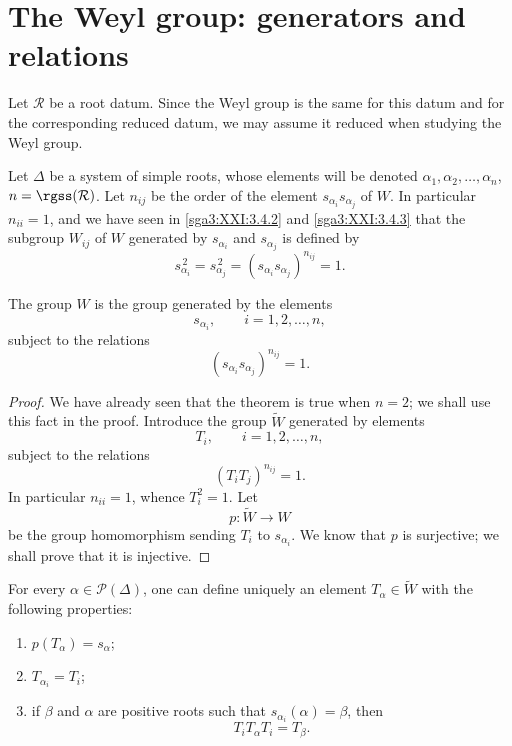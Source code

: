\section{The Weyl group: generators and relations}
\label{sga3:XXI:5}
\setcounter{theorem}{0}

Let \(\mathcal{R}\) be a root datum. Since the Weyl group is the same
for this datum and for the corresponding reduced datum, we may assume
it reduced when studying the Weyl group.

Let \(\Delta\) be a system of simple roots, whose elements will be
denoted \(\alpha_1,\alpha_2,\ldots,\alpha_n\), \(n=\rgss(\mathcal{R})\). Let
\(n_{ij}\) be the order of the element \(s_{\alpha_i}s_{\alpha_j}\) of \(W\).
In particular \(n_{ii}=1\), and we have seen in \ref{sga3:XXI:3.4.2} and
\ref{sga3:XXI:3.4.3} that the subgroup \(W_{ij}\) of \(W\)
generated by \(s_{\alpha_i}\) and \(s_{\alpha_j}\) is defined by
\[
 s_{\alpha_i}^{\,2}=s_{\alpha_j}^{\,2}
 =(s_{\alpha_i}s_{\alpha_j})^{n_{ij}}=1.
\]

\begin{theorem}\label{sga3:XXI:5.1}
The group \(W\) is the group generated by the elements
\[
 s_{\alpha_i},\qquad i=1,2,\ldots,n,
\]
subject to the relations
\[
 (s_{\alpha_i}s_{\alpha_j})^{n_{ij}}=1.
\]
\end{theorem}

\begin{proof}
We have already seen that the theorem is true when \(n=2\); we shall
use this fact in the proof. Introduce the group \(\widetilde W\)
generated by elements
\[
 T_i,\qquad i=1,2,\ldots,n,
\]
subject to the relations
\[
 (T_iT_j)^{n_{ij}}=1.
\]
In particular \(n_{ii}=1\), whence \(T_i^2=1\). Let
\[
 p:\widetilde W\longrightarrow W
\]
be the group homomorphism sending \(T_i\) to \(s_{\alpha_i}\). We know
that \(p\) is surjective; we shall prove that it is injective.
\end{proof}

\begin{lemma}\label{sga3:XXI:5.2}
For every \(\alpha\in\mathscr{P}(\Delta)\), one can define uniquely an
element \(T_\alpha\in\widetilde W\) with the following properties:
\begin{enumerate}
\item[(i)] \(p(T_\alpha)=s_\alpha\);
\item[(ii)] \(T_{\alpha_i}=T_i\);
\item[(iii)] if \(\beta\) and \(\alpha\) are positive roots such that
\(s_{\alpha_i}(\alpha)=\beta\), then
\[
 T_iT_\alpha T_i=T_\beta.
\]
\end{enumerate}
\end{lemma}
